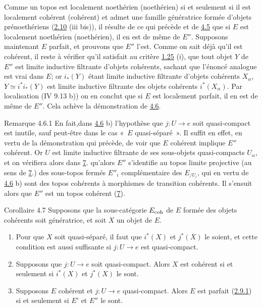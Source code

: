 \documentclass[10pt]{../fichiers-configuration-latex/smfart}
\begin{document}
Comme un topos est localement noethérien (\resp noethérien) si et
seulement si il est localement cohérent (\resp cohérent) et admet une
famille génératrice formée d'objets prénoethériens (\hyperref[VI.prop2.10]{2.10} (iii
bis)), il résulte de ce qui précède et de \hyperref[VI.cor4.5]{4.5} que si $E$ est
localement noethérien (\resp noethérien), il en est de même de
$E''$. Supposons maintenant $E$ parfait, et prouvons que $E''$
l'est. Comme on sait déjà qu'il est cohérent, il reste à vérifier
qu'il satisfait au critère \hyperref[VI.cor1.25]{1.25} (i), \ie que tout objet $Y$ de $E''$
est limite inductive filtrante d'objets  cohérents, sachant que
l'énoncé analogue est vrai dans $E$; or $i_{\ast}(Y)$ étant limite
inductive filtrante d'objets cohérents $X_{\alpha}$, $Y \simeq
i^{\ast}i_{\ast}(Y)$ est limite inductive filtrante des objets
cohérents $i^{\ast}(X_{\alpha})$. Par localisation (IV 9.13 b)) on en
conclut que si $E$ est localement parfait, il en est de même de
$E''$. Cela achève la démonstration de \hyperref[VI.prop4.6]{4.6}.

\begin{enonce*}[remark]{Remarque 4.6.1}
En fait,\pageoriginale dans \hyperref[VI.prop4.6]{4.6} b) l'hypothèse que $j :
U \to e$ soit quasi-compact est inutile, sauf peut-être dans le cas
« $E$ quasi-séparé ». Il suffit en effet, en vertu de la
démonstration qui précède, de voir que $E$ cohérent implique $E''$
cohérent. Or $U$ est limite inductive filtrante de ses sous-objets
quasi-compacts $U_{\alpha}$, et on vérifiera alors dans
\hyperref[VI.sec7]{7}. qu'alors $E''$ s'identifie au topos limite projective
(au sens de \hyperref[VI.sec7]{7}.) des sous-topos fermés $E''_i$
complémentaire des $E_{/U_i}$, qui en vertu de \hyperref[VI.prop4.6]{4.6} b)
sont des topos cohérents à morphismes de transition cohérents. Il
s'ensuit alors que $E''$ est un topos cohérent (\hyperref[VI.sec7]{7}).
\end{enonce*}

\begin{enonce*}{Corollaire 4.7}
Supposons que la sous-catégorie $E_{\mathrm{coh}}$ de $E$ formée des objets
cohérents soit génératrice, et soit $X$ un objet de $E$.
\begin{enumerate}
\renewcommand{\theenumi}{\alph{enumi}}
\renewcommand{\labelenumi}{\theenumi)}
\item Pour que $X$ soit quasi-séparé, il faut que $i^{\ast}(X)$ et
  $j^{\ast}(X)$ le soient, et cette condition est aussi suffisante si $j
  :U \to e$ est quasi-compact.

\item Supposons que $j : U \to e$ soit quasi-compact. Alors $X$ est
  cohérent si et seulement si $i^{\ast}(X)$ et $j^{\ast}(X)$ le sont.

\item Supposons $E$ cohérent et $j : U \to e$ quasi-compact. Alors $E$
  est parfait (\hyperref[VI.def2.9.1]{2.9.1}) si et seulement si $E'$ et $E''$ le sont.
\end{enumerate}
\end{enonce*}
\end{document}
